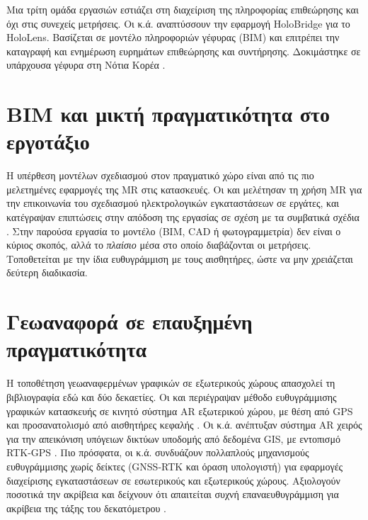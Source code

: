 Μια τρίτη ομάδα εργασιών εστιάζει στη διαχείριση της πληροφορίας επιθεώρησης και όχι στις συνεχείς μετρήσεις. Οι  κ.ά. αναπτύσσουν την εφαρμογή HoloBridge για το HoloLens. Βασίζεται σε μοντέλο πληροφοριών γέφυρας (BIM) και επιτρέπει την καταγραφή και ενημέρωση ευρημάτων επιθεώρησης και συντήρησης. Δοκιμάστηκε σε υπάρχουσα γέφυρα στη Νότια Κορέα \cite{nguyen2022holobridge}.

\section{BIM και μικτή πραγματικότητα στο εργοτάξιο}
\label{sec:rw-bim}

Η υπέρθεση μοντέλων σχεδιασμού στον πραγματικό χώρο είναι από τις πιο μελετημένες εφαρμογές της MR στις κατασκευές. Οι  και  μελέτησαν τη χρήση MR για την επικοινωνία του σχεδιασμού ηλεκτρολογικών εγκαταστάσεων σε εργάτες, και κατέγραψαν επιπτώσεις στην απόδοση της εργασίας σε σχέση με τα συμβατικά σχέδια \cite{chalhoub2018mixed}. Στην παρούσα εργασία το μοντέλο (BIM, CAD ή φωτογραμμετρία) δεν είναι ο κύριος σκοπός, αλλά το \emph{πλαίσιο} μέσα στο οποίο διαβάζονται οι μετρήσεις. Τοποθετείται με την ίδια ευθυγράμμιση με τους αισθητήρες, ώστε να μην χρειάζεται δεύτερη διαδικασία.


\section{Γεωαναφορά σε επαυξημένη πραγματικότητα}
\label{sec:rw-georef}

Η τοποθέτηση γεωαναφερμένων γραφικών σε εξωτερικούς χώρους απασχολεί τη βιβλιογραφία εδώ και δύο δεκαετίες. Οι  και  περιέγραψαν μέθοδο ευθυγράμμισης γραφικών κατασκευής σε κινητό σύστημα AR εξωτερικού χώρου, με θέση από GPS και προσανατολισμό από αισθητήρες κεφαλής \cite{behzadan2007georeferenced}. Οι  κ.ά. ανέπτυξαν σύστημα AR χειρός για την απεικόνιση υπόγειων δικτύων υποδομής από δεδομένα GIS, με εντοπισμό RTK-GPS \cite{schall2009handheld}. Πιο πρόσφατα, οι  κ.ά. συνδυάζουν πολλαπλούς μηχανισμούς ευθυγράμμισης χωρίς δείκτες (GNSS-RTK και όραση υπολογιστή) για εφαρμογές διαχείρισης εγκαταστάσεων σε εσωτερικούς και εξωτερικούς χώρους. Αξιολογούν ποσοτικά την ακρίβεια και δείχνουν ότι απαιτείται συχνή επαναευθυγράμμιση για ακρίβεια της τάξης του δεκατόμετρου \cite{messi2024seamless}.

